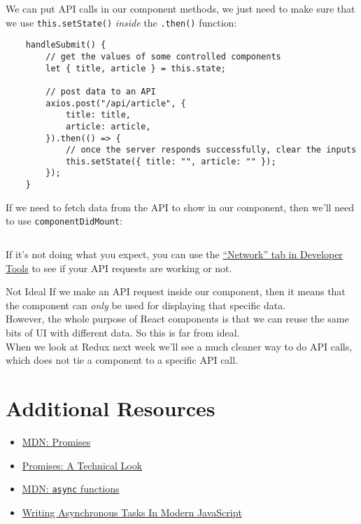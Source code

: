 We can put API calls in our component methods, we just need to make sure that we use \texttt{this.setState()} \textit{inside} the \texttt{.then()} function:

\begin{verbatim}
    handleSubmit() {
        // get the values of some controlled components
        let { title, article } = this.state;

        // post data to an API
        axios.post("/api/article", {
            title: title,
            article: article,
        }).then(() => {
            // once the server responds successfully, clear the inputs
            this.setState({ title: "", article: "" });
        });
    }
\end{verbatim}

If we need to fetch data from the API to show in our component, then we'll need to use \texttt{componentDidMount}:

\inputminted{js}{03-async/figures/01-Articles.js}

If it's not doing what you expect, you can use the \href{https://developer.mozilla.org/en-US/docs/Tools/Network_Monitor}{``Network'' tab in Developer Tools} to see if your API requests are working or not.

\begin{infobox}{Not Ideal}
    If we make an API request inside our component, then it means that the component can \textit{only} be used for displaying that specific data.
    \\

    However, the whole purpose of React components is that we can reuse the same bits of UI with different data. So this is far from ideal.
    \\

    When we look at Redux next week we'll see a much cleaner way to do API calls, which does not tie a component to a specific API call.
\end{infobox}

\section{Additional Resources}

\begin{itemize}[leftmargin=*]
    \item \href{https://developer.mozilla.org/en-US/docs/Web/JavaScript/Reference/Global_Objects/Promise}{MDN: Promises}
    \item \href{http://exploringjs.com/es6/ch_promises.html}{Promises: A Technical Look}
    \item \href{https://developer.mozilla.org/en-US/docs/Web/JavaScript/Reference/Statements/async_function}{MDN: \texttt{async} functions}
    \item \href{https://www.smashingmagazine.com/2019/10/asynchronous-tasks-modern-javascript/}{Writing Asynchronous Tasks In Modern JavaScript}
\end{itemize}
